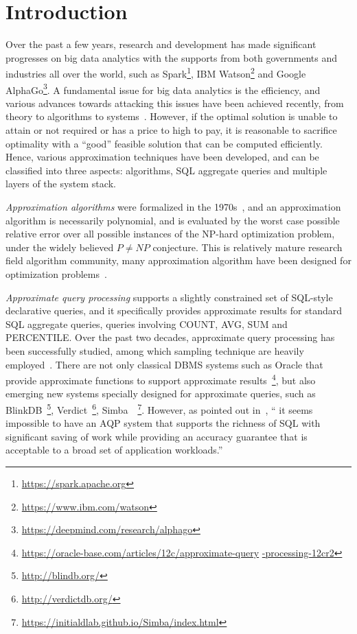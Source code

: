 \section{Introduction}
\label{sec-intro}


Over the past a few years, research and development has made significant progresses on big data analytics with the supports from both governments and industries all over the world, such as Spark\footnote{\small \url{https://spark.apache.org}}, IBM Watson\footnote{\small \url{https://www.ibm.com/watson}} and Google AlphaGo\footnote{\small \url{https://deepmind.com/research/alphago}}. A fundamental issue for big data analytics is the efficiency, and various advances towards attacking this issues have been achieved recently, from theory to algorithms to systems~\cite{FanGN13,Jordan15,ZahariaXWDADMRV16}. However, if the optimal solution is unable to attain or not required or has a price to high to pay, it is reasonable to sacrifice optimality with a ``good'' feasible solution that can be computed efficiently. Hence, various approximation techniques have been developed, and can be classified into three aspects: algorithms, SQL aggregate queries and multiple layers of the system stack.
\bi
\item[(1)] {\em Approximation algorithms} were formalized in the 1970s~\cite{GareyGU72,Johnson74a}, and an approximation algorithm is necessarily polynomial, and is evaluated by the worst case possible relative error over all possible instances of the  NP-hard optimization problem, under the widely believed $P\ne NP$ conjecture. This is relatively mature research field algorithm community, many approximation algorithm have been designed for optimization problems~\cite{Dorit96,approx03,Ausiello99}.
\item[(2)] {\em Approximate query processing} supports a slightly constrained set of SQL-style declarative queries, and it specifically provides approximate results for standard SQL aggregate queries, \eg queries involving COUNT, AVG, SUM and PERCENTILE. Over the past two decades, approximate query processing has been successfully studied, among which sampling technique are heavily employed~\cite{ChaudhuriDK17,Mozafari17,Kraska17,GarofalakisG01}. There are not only classical DBMS systems such as Oracle that provide approximate functions to support approximate results~\footnote{\small \url{https://oracle-base.com/articles/12c/approximate-query} \url{-processing-12cr2}}, but also emerging new systems specially designed for approximate queries, such as BlinkDB~\footnote{\small \url{http://blindb.org/}}, Verdict~\footnote{\small \url{http://verdictdb.org/}}, Simba~~\footnote{\small \url{https://initialdlab.github.io/Simba/index.html}}. However, as pointed out in~\cite{ChaudhuriDK17}, `` it seems impossible to have an AQP system that supports the richness of SQL with significant saving of work while providing an accuracy guarantee that is acceptable to a broad set of application workloads.''

